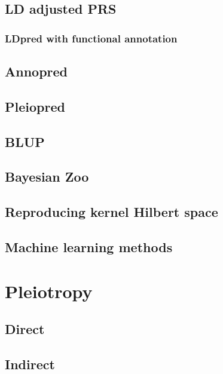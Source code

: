 \documentclass[]{book}
\theoremstyle{definition}
\theoremstyle{definition}
\theoremstyle{definition}
\theoremstyle{remark}
\begin{document}
\section{LD adjusted PRS}\label{ld-adjusted-prs}

\subsection{LDpred with functional
annotation}\label{ldpred-with-functional-annotation}

\section{Annopred}\label{annopred}

\section{Pleiopred}\label{pleiopred}

\section{BLUP}\label{blup}

\section{Bayesian Zoo}\label{bayesian-zoo}

\section{Reproducing kernel Hilbert
space}\label{reproducing-kernel-hilbert-space}

\section{Machine learning methods}\label{machine-learning-methods}

\chapter{Pleiotropy}\label{pleiotropy}

\section{Direct}\label{direct}

\section{Indirect}\label{indirect}
\end{document}
